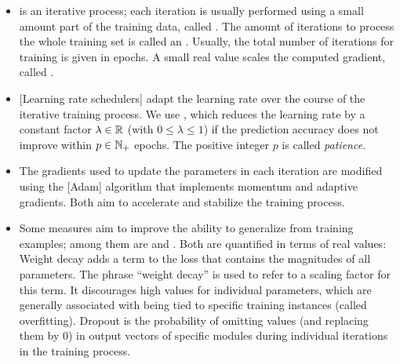\documentclass[../document.tex]{subfiles}
\begin{document}
    \begin{itemize}
        \item
             is an iterative process; each iteration is usually performed using a small amount part of the training data, called .
            The amount of iterations to process the whole training set is called an . Usually, the total number of iterations for training is given in epochs.
            A small real value scales the computed gradient, called .
        \item {}[Learning rate schedulers] adapt the learning rate over the course of the iterative training process.
            We use , which reduces the learning rate by a constant factor \(\lambda \in \mathbb{R}\) (with \(0\leq\lambda\leq1\)) if the prediction accuracy does not improve within \(p\in\mathbb{N}_+\) epochs.
            The positive integer \(p\) is called \emph{patience}.
        \item
            The gradients used to update the parameters in each iteration are modified using the [Adam] algorithm \citep{adam,adamw} that implements momentum and adaptive gradients.
            Both aim to accelerate and stabilize the training process.
        \item
            Some measures aim to improve the ability to generalize from training examples; among them are  and  \citep{dropout}.
            Both are quantified in terms of real values:
                Weight decay adds a term to the loss that contains the magnitudes of all parameters.
                The phrase ``weight decay'' is used to refer to a scaling factor for this term.
                It discourages high values for individual parameters, which are generally associated with being tied to specific training instances (called overfitting).
                Dropout is the probability of omitting values (and replacing them by \(0\)) in output vectors of specific modules during individual iterations in the training process.
    \end{itemize}
\end{document}
